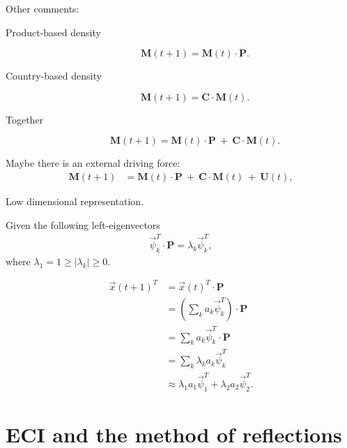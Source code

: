 \documentclass[12pt]{article}
\newcommand{\mtx}[1]{\mathbf{ #1}}
\begin{document}
\newpage
Other comments:
\begin{description}
	\item[Product-based density] 
	$$\mtx{M}(t+1) = \mtx{M}(t)\cdot \mtx{P}.$$
	\item[Country-based density]
	$$\mtx{M}(t+1) = \mtx{C}\cdot\mtx{M}(t).$$
	\item[Together]
	$$\mtx{M}(t+1) = \mtx{M}(t)\cdot \mtx{P} ~ + ~ \mtx{C}\cdot\mtx{M}(t).$$
\end{description}
Maybe there is an external driving force:
\begin{align}
	\mtx{M}(t+1) &= \mtx{M}(t)\cdot \mtx{P} ~ + ~ \mtx{C}\cdot\mtx{M}(t)  ~ + ~ \mtx{U}(t),
\end{align}

\newpage
Low dimensional representation. 

Given the following left-eigenvectors
\begin{align}
	\vec{\psi}_k^T \cdot\mtx{P} = \lambda_k \vec{\psi}_k^T,
\end{align}
where $\lambda_1 = 1 \geq \left|\lambda_k\right| \geq 0$.

\begin{align*}
	\vec{x}(t+1)^T &= \vec{x}(t)^T\cdot\mtx{P} \\
	&= \left(\sum_k a_k \vec{\psi}_k^T \right)\cdot\mtx{P} \\
	&= \sum_k a_k \vec{\psi}_k^T \cdot\mtx{P} \\
	&= \sum_k \lambda_k a_k \vec{\psi}_k^T  \\
	&\approx \lambda_1 a_1 \vec{\psi}_1^T + \lambda_2 a_2 \vec{\psi}_2^T.
\end{align*}






\newpage
\section{ECI and the method of reflections}
\end{document}
